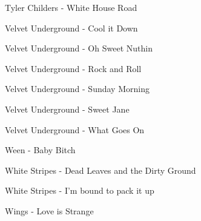 Tyler Childers - White House Road \dotfill \pageref{White House Road - Tyler Childers} 

Velvet Underground - Cool it Down \dotfill \pageref{Cool it Down - Velvet Underground} 

Velvet Underground - Oh Sweet Nuthin \dotfill \pageref{Oh Sweet Nuthin - Velvet Underground} 

Velvet Underground - Rock and Roll \dotfill \pageref{Rock and Roll - Velvet Underground} 

Velvet Underground - Sunday Morning \dotfill \pageref{Sunday Morning - Velvet Underground} 

Velvet Underground - Sweet Jane \dotfill \pageref{Sweet Jane - Velvet Underground} 

Velvet Underground - What Goes On \dotfill \pageref{What Goes On - Velvet Underground} 

Ween - Baby Bitch \dotfill \pageref{Baby Bitch - Ween} 

White Stripes - Dead Leaves and the Dirty Ground \dotfill \pageref{Dead Leaves and the Dirty Ground - White Stripes} 

White Stripes - I'm bound to pack it up \dotfill \pageref{I'm bound to pack it up - White Stripes} 

Wings - Love is Strange \dotfill \pageref{Love is Strange - Wings} 

